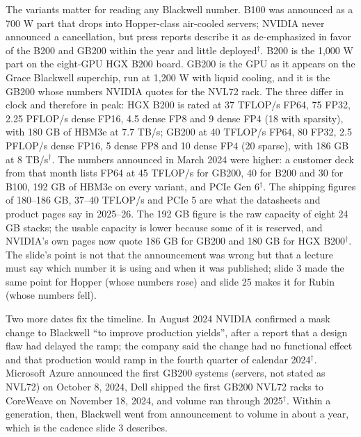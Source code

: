 \documentclass[11pt,letterpaper]{article}
\begin{document}
The variants matter for reading any Blackwell number. B100 was announced as a 700 W part that drops into Hopper-class air-cooled servers; NVIDIA never announced a cancellation, but press reports describe it as de-emphasized in favor of the B200 and GB200 within the year and little deployed$^\dagger$. B200 is the 1{,}000 W part on the eight-GPU HGX B200 board. GB200 is the GPU as it appears on the Grace Blackwell superchip, run at 1{,}200 W with liquid cooling, and it is the GB200 whose numbers NVIDIA quotes for the NVL72 rack. The three differ in clock and therefore in peak: HGX B200 is rated at 37 TFLOP/s FP64, 75 FP32, 2.25 PFLOP/s dense FP16, 4.5 dense FP8 and 9 dense FP4 (18 with sparsity), with 180 GB of HBM3e at 7.7 TB/s; GB200 at 40 TFLOP/s FP64, 80 FP32, 2.5 PFLOP/s dense FP16, 5 dense FP8 and 10 dense FP4 (20 sparse), with 186 GB at 8 TB/s$^\dagger$. The numbers announced in March 2024 were higher: a customer deck from that month lists FP64 at 45 TFLOP/s for GB200, 40 for B200 and 30 for B100, 192 GB of HBM3e on every variant, and PCIe Gen 6$^\dagger$. The shipping figures of 180--186 GB, 37--40 TFLOP/s and PCIe 5 are what the datasheets and product pages say in 2025--26. The 192 GB figure is the raw capacity of eight 24 GB stacks; the usable capacity is lower because some of it is reserved, and NVIDIA's own pages now quote 186 GB for GB200 and 180 GB for HGX B200$^\dagger$. The slide's point is not that the announcement was wrong but that a lecture must say which number it is using and when it was published; slide 3 made the same point for Hopper (whose numbers rose) and slide 25 makes it for Rubin (whose numbers fell).

Two more dates fix the timeline. In August 2024 NVIDIA confirmed a mask change to Blackwell ``to improve production yields'', after a report that a design flaw had delayed the ramp; the company said the change had no functional effect and that production would ramp in the fourth quarter of calendar 2024$^\dagger$. Microsoft Azure announced the first GB200 systems (servers, not stated as NVL72) on October 8, 2024, Dell shipped the first GB200 NVL72 racks to CoreWeave on November 18, 2024, and volume ran through 2025$^\dagger$. Within a generation, then, Blackwell went from announcement to volume in about a year, which is the cadence slide 3 describes.
\end{document}
